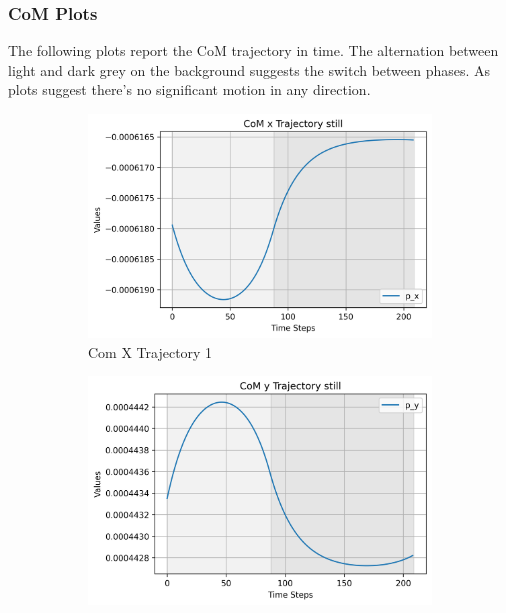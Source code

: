 \documentclass[main.tex]{subfiles}
\begin{document}
\subsubsection*{CoM Plots}
The following plots report the CoM trajectory in time. 
The alternation between light and dark grey on the background suggests the switch between phases.
As plots suggest there's no significant motion in any direction.
\begin{figure}[H]
    \centering
    \begin{subfigure}[b]{0.45\textwidth}
        \centering
        \includegraphics[width=\textwidth]{figures/CoM x Trajectory still.png}
        \caption{Com X Trajectory 1}
        \label{fig:sub1_still}
    \end{subfigure}
    \hfill
    \begin{subfigure}[b]{0.45\textwidth}
        \centering
        \includegraphics[width=\textwidth]{figures/CoM y Trajectory still.png}

\end{subfigure}
\end{figure}
\end{document}
